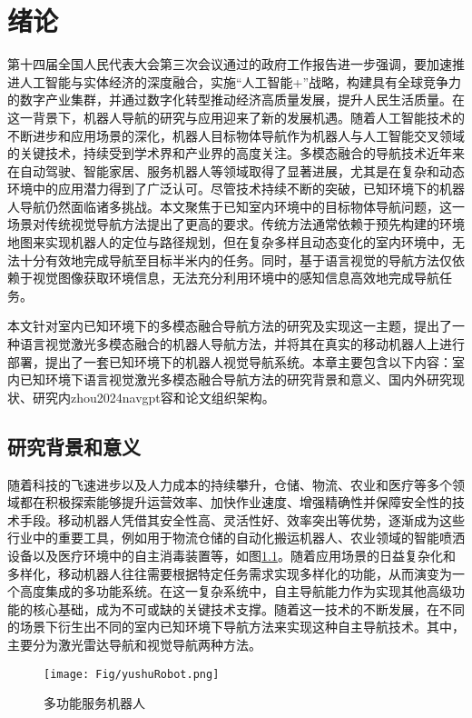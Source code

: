 \chapter{绪论}
%
	第十四届全国人民代表大会第三次会议通过的政府工作报告进一步强调，要加速推进人工智能与实体经济的深度融合，实施“人工智能+”战略，构建具有全球竞争力的数字产业集群，并通过数字化转型推动经济高质量发展，提升人民生活质量\cite{China2025}。在这一背景下，机器人导航的研究与应用迎来了新的发展机遇。随着人工智能技术的不断进步和应用场景的深化，机器人目标物体导航\cite{zhang2022survey}作为机器人与人工智能交叉领域的关键技术，持续受到学术界和产业界的高度关注。多模态融合的导航技术近年来在自动驾驶、智能家居、服务机器人等领域取得了显著进展\cite{majumdar2022zson}，尤其是在复杂和动态环境中的应用潜力得到了广泛认可。尽管技术持续不断的突破，已知环境下的机器人导航仍然面临诸多挑战。本文聚焦于已知室内环境中的目标物体导航问题\cite{sun2024survey}，这一场景对传统视觉导航方法提出了更高的要求。传统方法通常依赖于预先构建的环境地图来实现机器人的定位与路径规划，但在复杂多样且动态变化的室内环境中，无法十分有效地完成导航至目标半米内的任务\cite{mavrogiannis2023core}。同时，基于语言视觉的导航方法仅依赖于视觉图像获取环境信息，无法充分利用环境中的感知信息高效地完成导航任务\cite{li2023reinforcement}。

	本文针对室内已知环境下的多模态融合导航方法的研究及实现这一主题，提出了一种语言视觉激光多模态融合的机器人导航方法，并将其在真实的移动机器人上进行部署，提出了一套已知环境下的机器人视觉导航系统。本章主要包含以下内容：室内已知环境下语言视觉激光多模态融合导航方法的研究背景和意义、国内外研究现状、研究内zhou2024navgpt容和论文组织架构。

\section{研究背景和意义}
	随着科技的飞速进步以及人力成本的持续攀升，仓储、物流、农业和医疗等多个领域都在积极探索能够提升运营效率、加快作业速度、增强精确性并保障安全性的技术手段。移动机器人凭借其安全性高、灵活性好、效率突出等优势，逐渐成为这些行业中的重要工具\cite{reddy2023advancements}，例如用于物流仓储的自动化搬运机器人、农业领域的智能喷洒设备以及医疗环境中的自主消毒装置等，如图\ref{serverrobot}。随着应用场景的日益复杂化和多样化，移动机器人往往需要根据特定任务需求实现多样化的功能，从而演变为一个高度集成的多功能系统。在这一复杂系统中，自主导航能力作为实现其他高级功能的核心基础，成为不可或缺的关键技术支撑。随着这一技术的不断发展，在不同的场景下衍生出不同的室内已知环境下导航方法来实现这种自主导航技术。其中，主要分为激光雷达导航\cite{zhang2014loam}和视觉导航\cite{kazerouni2022survey}两种方法。
	\begin{figure}[htbp]
		\centering
		\texttt{[image: Fig/yushuRobot.png]}
		\caption{\label{serverrobot}多功能服务机器人}
	\end{figure}

